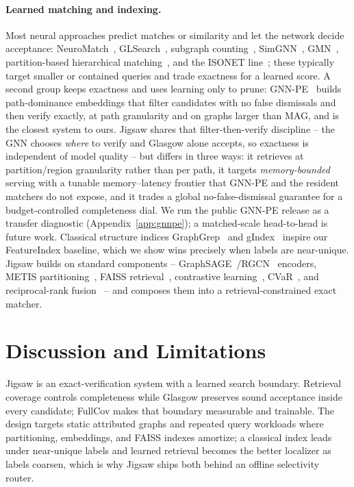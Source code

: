 \documentclass[sigconf, nonacm]{acmart}
\begin{document}
\paragraph{Learned matching and indexing.}
Most neural approaches predict matches or similarity and let the network decide acceptance: NeuroMatch~\cite{ref_neuromatch}, GLSearch~\cite{ref_glsearch}, subgraph counting~\cite{ref_nsic}, SimGNN~\cite{ref_simgnn}, GMN~\cite{ref_gmn}, partition-based hierarchical matching~\cite{ref_psimgnn}, and the ISONET line~\cite{ref_isonet,ref_isonetpp,ref_neuraldesign,ref_neugn}; these typically target smaller or contained queries and trade exactness for a learned score. A second group keeps exactness and uses learning only to prune: GNN-PE~\cite{ref_gnnpe} builds path-dominance embeddings that filter candidates with no false dismissals and then verify exactly, at path granularity and on graphs larger than MAG, and is the closest system to ours. Jigsaw shares that filter-then-verify discipline -- the GNN chooses \emph{where} to verify and Glasgow alone accepts, so exactness is independent of model quality -- but differs in three ways: it retrieves at partition/region granularity rather than per path, it targets \emph{memory-bounded} serving with a tunable memory--latency frontier that GNN-PE and the resident matchers do not expose, and it trades a global no-false-dismissal guarantee for a budget-controlled completeness dial. We run the public GNN-PE release as a transfer diagnostic (Appendix~\ref{app:gnnpe}); a matched-scale head-to-head is future work. Classical structure indices GraphGrep~\cite{ref_graphgrep} and gIndex~\cite{ref_gindex} inspire our FeatureIndex baseline, which we show wins precisely when labels are near-unique. Jigsaw builds on standard components -- GraphSAGE~\cite{ref_graphsage}/RGCN~\cite{ref_rgcn} encoders, METIS partitioning~\cite{ref_metis}, FAISS retrieval~\cite{ref_faiss}, contrastive learning~\cite{ref_cpc}, CVaR~\cite{ref_cvar}, and reciprocal-rank fusion~\cite{ref_rrf} -- and composes them into a retrieval-constrained exact matcher.

\section{Discussion and Limitations}
\label{sec:limits}

Jigsaw is an exact-verification system with a learned search boundary. Retrieval coverage controls completeness while Glasgow preserves sound acceptance inside every candidate; FullCov makes that boundary measurable and trainable. The design targets static attributed graphs and repeated query workloads where partitioning, embeddings, and FAISS indexes amortize; a classical index leads under near-unique labels and learned retrieval becomes the better localizer as labels coarsen, which is why Jigsaw ships both behind an offline selectivity router.
\end{document}
